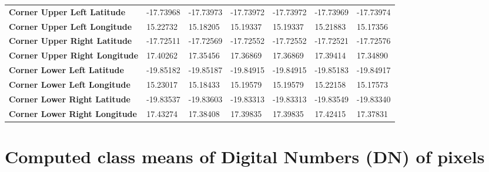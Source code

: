 \documentclass[climate,article,submit,pdftex,moreauthors]{Definitions/mdpi}
\begin{document}
\begin{landscape}
\begin{table}
\begin{tabular}{|l|l|l|l|l|l|l|}
        \textbf{Corner Upper Left Latitude} & -17.73968 & -17.73973 & -17.73972 & -17.73972 & -17.73969 & -17.73974 \\
        \textbf{Corner Upper Left Longitude} & 15.22732 & 15.18205 & 15.19337 & 15.19337 & 15.21883 & 15.17356 \\
        \textbf{Corner Upper Right Latitude} & -17.72511 & -17.72569 & -17.72552 & -17.72552 & -17.72521 & -17.72576 \\
        \textbf{Corner Upper Right Longitude} & 17.40262 & 17.35456 & 17.36869 & 17.36869 & 17.39414 & 17.34890 \\
        \textbf{Corner Lower Left Latitude} & -19.85182 & -19.85187 & -19.84915 & -19.84915 & -19.85183 & -19.84917 \\
        \textbf{Corner Lower Left Longitude} & 15.23017 & 15.18433 & 15.19579 & 15.19579 & 15.22158 & 15.17573 \\
        \textbf{Corner Lower Right Latitude} & -19.83537 & -19.83603 & -19.83313 & -19.83313 & -19.83549 & -19.83340 \\
        \textbf{Corner Lower Right Longitude} & 17.43274 & 17.38408 & 17.39835 & 17.39835 & 17.42415 & 17.37831 \\
    \end{tabular}%
\end{table}
 \end{landscape}

\section[\appendixname~\thesection]{Computed class means of Digital Numbers (DN) of pixels}
\end{document}
